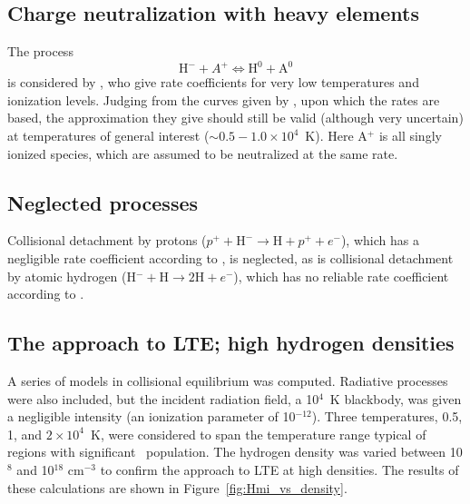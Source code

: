 \subsection{Charge neutralization with heavy elements}

The process
\begin{equation}
{{\mathrm{H}}^ - } + {A^ + } \Leftrightarrow {{\mathrm{H}}^{\mathrm{0}}} +
{{\mathrm{A}}^{\mathrm{0}}}
\end{equation}
is considered by \citet{Dalgarno1973}, who give rate coefficients
for very low temperatures and ionization levels.  Judging from the curves
given by \citet{Peterson1971}, upon which the \citet{Dalgarno1973} rates
are based, the approximation they give should still be valid (although very
uncertain) at temperatures of general interest ($\sim 0.5 - 1.0 \times
10^4$~K).  Here
A$^+$ is all singly ionized species, which are assumed to be neutralized at
the same rate.

\subsection{Neglected processes}

Collisional detachment by protons ($p^+ + \mathrm{H}^- \to \mathrm{H} +p^+ + e^-$), which has a
negligible rate coefficient according to \citet{Janev1987}, is neglected,
as is collisional detachment by atomic hydrogen (H$^- + \mathrm{H} \to 2\mathrm{H}
+ e^-$), which
has no reliable rate coefficient according to
\citet{Lites1984}.

\subsection{The approach to LTE; high hydrogen densities}

A series of models in collisional equilibrium was computed.  Radiative
processes were also included, but the incident radiation field, a 10$^4$~K
blackbody, was given a negligible intensity (an ionization parameter of
10$^{-12}$).  Three temperatures, 0.5, 1, and $2 \times 10^4$~K, were considered to span
the temperature range typical of regions with significant \hminus\ population.
The hydrogen density was varied between 10$^8$ and 10$^{18}$ cm$^{-3}$ to confirm the
approach to LTE at high densities.  The results of these calculations are
shown in Figure~\ref{fig:Hmi_vs_density}.

